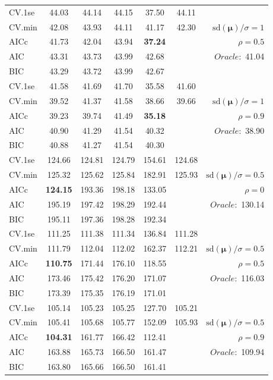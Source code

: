 \begin{table}
\begin{center}
\begin{tabular}{l*{5}{c}|r}
 \hline 
CV.1se & 44.03 & 44.14 & 44.15 & 37.50 & 44.11 & \\
CV.min & 42.08 & 43.93 & 44.11 & 41.17 & 42.30 &  $\mathrm{sd}(\mathbf{\mu})/\sigma=1$ \\
AICc & 41.73 & 42.04 & 43.94 & {\bf 37.24} & & $\rho=0.5$ \\
AIC & 43.31 & 43.73 & 43.99 & 42.68 & &  \multirow{2}{*}{$Oracle: $ 41.04} \\
BIC & 43.29 & 43.72 & 43.99 & 42.67 & &  \\
 \hline 
CV.1se & 41.58 & 41.69 & 41.70 & 35.58 & 41.60 & \\
CV.min & 39.52 & 41.37 & 41.58 & 38.66 & 39.66 &  $\mathrm{sd}(\mathbf{\mu})/\sigma=1$ \\
AICc & 39.23 & 39.74 & 41.49 & {\bf 35.18} & & $\rho=0.9$ \\
AIC & 40.90 & 41.29 & 41.54 & 40.32 & &  \multirow{2}{*}{$Oracle: $ 38.90} \\
BIC & 40.88 & 41.27 & 41.54 & 40.30 & &  \\
 \hline 
CV.1se & 124.66 & 124.81 & 124.79 & 154.61 & 124.68 & \\
CV.min & 125.32 & 125.62 & 125.84 & 182.91 & 125.93 &  $\mathrm{sd}(\mathbf{\mu})/\sigma=0.5$ \\
AICc & {\bf 124.15} & 193.36 & 198.18 & 133.05 & & $\rho=0$ \\
AIC & 195.19 & 197.42 & 198.29 & 192.44 & &  \multirow{2}{*}{$Oracle: $ 130.14} \\
BIC & 195.11 & 197.36 & 198.28 & 192.34 & &  \\
 \hline 
CV.1se & 111.25 & 111.38 & 111.34 & 136.84 & 111.28 & \\
CV.min & 111.79 & 112.04 & 112.02 & 162.37 & 112.21 &  $\mathrm{sd}(\mathbf{\mu})/\sigma=0.5$ \\
AICc & {\bf 110.75} & 171.44 & 176.10 & 118.55 & & $\rho=0.5$ \\
AIC & 173.46 & 175.42 & 176.20 & 171.07 & &  \multirow{2}{*}{$Oracle: $ 116.03} \\
BIC & 173.39 & 175.35 & 176.19 & 171.01 & &  \\
 \hline 
CV.1se & 105.14 & 105.23 & 105.25 & 127.70 & 105.21 & \\
CV.min & 105.41 & 105.68 & 105.77 & 152.09 & 105.93 &  $\mathrm{sd}(\mathbf{\mu})/\sigma=0.5$ \\
AICc & {\bf 104.31} & 161.77 & 166.42 & 112.41 & & $\rho=0.9$ \\
AIC & 163.88 & 165.73 & 166.50 & 161.47 & &  \multirow{2}{*}{$Oracle: $ 109.94} \\
BIC & 163.80 & 165.66 & 166.50 & 161.41 & &  \\
 \hline 
\end{tabular}
\end{center}
\vspace{-1cm}
\end{table}





